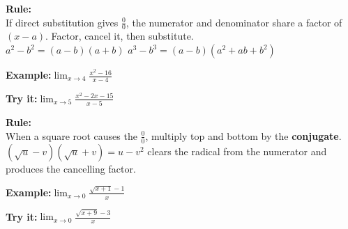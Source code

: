 \documentclass[12pt]{article}
\begin{document}

\begin{formulabox}\textbf{Rule:}\\[4pt]
If direct substitution gives $\tfrac{0}{0}$, the numerator and denominator share
a factor of $(x-a)$. Factor, cancel it, then substitute.\\[2pt]
$a^2-b^2=(a-b)(a+b)$ \qquad $a^3-b^3=(a-b)(a^2+ab+b^2)$
\end{formulabox}
\begin{examplebox}\textbf{Example:}\quad $\displaystyle\lim_{x\to4}\frac{x^2-16}{x-4}$
\end{examplebox}
\begin{tryitbox}\textbf{Try it:}\quad $\displaystyle\lim_{x\to5}\frac{x^2-2x-15}{x-5}$\\[2pt]
\end{tryitbox}

\begin{formulabox}\textbf{Rule:}\\[4pt]
When a square root causes the $\tfrac{0}{0}$, multiply top and bottom by the
\textbf{conjugate}. $(\sqrt{u}-v)(\sqrt{u}+v)=u-v^2$ clears the radical from the
numerator and produces the cancelling factor.
\end{formulabox}
\begin{examplebox}\textbf{Example:}\quad $\displaystyle\lim_{x\to0}\frac{\sqrt{x+1}-1}{x}$
\end{examplebox}
\begin{tryitbox}\textbf{Try it:}\quad $\displaystyle\lim_{x\to0}\frac{\sqrt{x+9}-3}{x}$\\[2pt]
\end{tryitbox}
\end{document}
